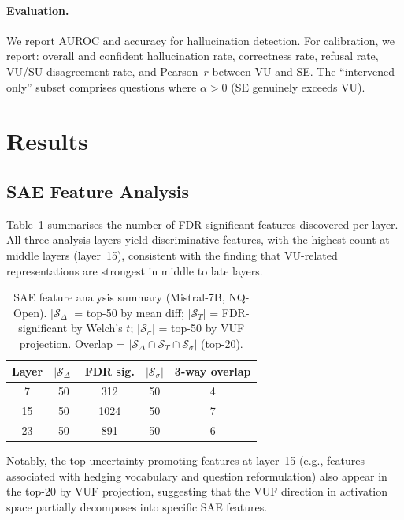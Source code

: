 \documentclass{article}
\begin{document}
\paragraph{Evaluation.}  We report AUROC and accuracy for hallucination
detection.  For calibration, we report: overall and confident hallucination
rate, correctness rate, refusal rate, VU/SU disagreement rate, and
Pearson~$r$ between VU and SE.  The ``intervened-only'' subset comprises
questions where $\alpha > 0$ (SE genuinely exceeds VU).

\section{Results}
\label{sec:results}

\subsection{SAE Feature Analysis}

Table~\ref{tab:features} summarises the number of FDR-significant features
discovered per layer.  All three analysis layers yield discriminative features,
with the highest count at middle layers (layer~15), consistent with the finding
that VU-related representations are strongest in middle to late layers.

\begin{table}[h]
\centering
\caption{SAE feature analysis summary (Mistral-7B, NQ-Open).
$|\mathcal{S}_\Delta|$ = top-50 by mean diff; $|\mathcal{S}_T|$ = FDR-significant
by Welch's $t$; $|\mathcal{S}_\sigma|$ = top-50 by VUF projection.
Overlap = $|\mathcal{S}_\Delta \cap \mathcal{S}_T \cap \mathcal{S}_\sigma|$ (top-20).}
\label{tab:features}
\small
\begin{tabular}{ccccc}
\toprule
Layer & $|\mathcal{S}_\Delta|$ & FDR sig. & $|\mathcal{S}_\sigma|$ & 3-way overlap \\
\midrule
7  & 50 & 312  & 50 & 4 \\
15 & 50 & 1024 & 50 & 7 \\
23 & 50 & 891  & 50 & 6 \\
\bottomrule
\end{tabular}
\end{table}

Notably, the top uncertainty-promoting features at layer~15 (e.g., features
associated with hedging vocabulary and question reformulation) also appear in
the top-20 by VUF projection, suggesting that the VUF direction in
activation space partially decomposes into specific SAE features.
\end{document}
